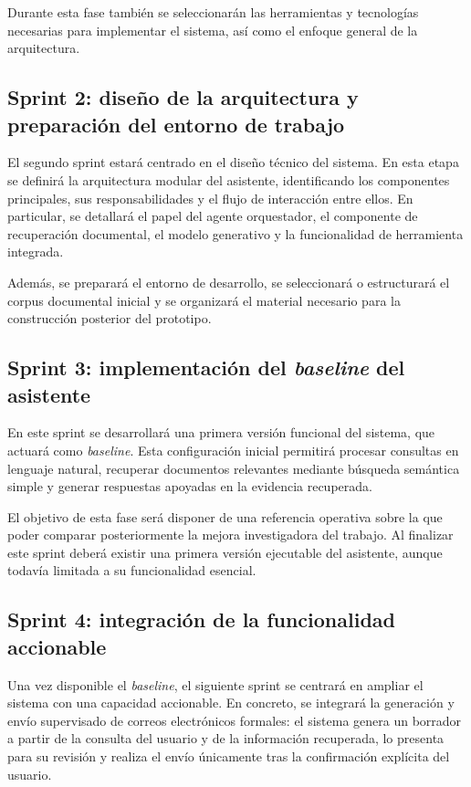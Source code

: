 Durante esta fase también se seleccionarán las herramientas y tecnologías necesarias para implementar el sistema, así como el enfoque general de la arquitectura.

\subsection{Sprint 2: diseño de la arquitectura y preparación del entorno de trabajo}

El segundo sprint estará centrado en el diseño técnico del sistema. En esta etapa se definirá la arquitectura modular del asistente, identificando los componentes principales, sus responsabilidades y el flujo de interacción entre ellos. 
En particular, se detallará el papel del agente orquestador, el componente de recuperación documental, el modelo generativo y la funcionalidad de herramienta integrada.

Además, se preparará el entorno de desarrollo, se seleccionará o estructurará el corpus documental inicial y se organizará el material necesario para la construcción posterior del prototipo.

\subsection{Sprint 3: implementación del \textit{baseline} del asistente}

En este sprint se desarrollará una primera versión funcional del sistema, que actuará como \textit{baseline}. 
Esta configuración inicial permitirá procesar consultas en lenguaje natural, recuperar documentos relevantes mediante búsqueda semántica simple y generar respuestas apoyadas en la evidencia recuperada.

El objetivo de esta fase será disponer de una referencia operativa sobre la que poder comparar posteriormente la mejora investigadora del trabajo. 
Al finalizar este sprint deberá existir una primera versión ejecutable del asistente, aunque todavía limitada a su funcionalidad esencial.

\subsection{Sprint 4: integración de la funcionalidad accionable}

Una vez disponible el \textit{baseline}, el siguiente sprint se centrará en ampliar el sistema con una capacidad accionable. 
En concreto, se integrará la generación y envío supervisado de correos electrónicos formales: el sistema genera un borrador a partir de la consulta del usuario y de la información recuperada, lo presenta para su revisión y realiza el envío únicamente tras la confirmación explícita del usuario.

